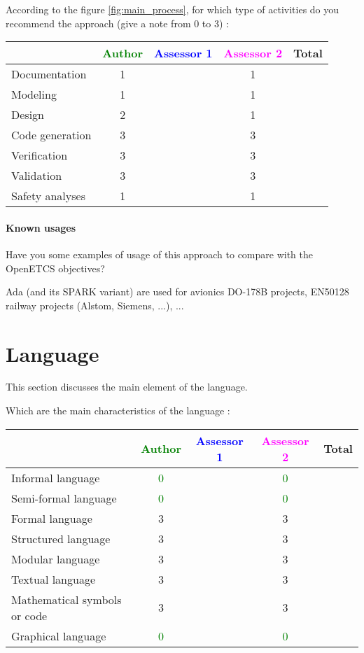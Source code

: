 According to the figure \ref{fig:main_process}, for which type of activities do you recommend the approach (give a note from 0 to  3) :

\begin{tabular}{|l | c | c | c | c|}
\hline
& \textcolor{green}{Author} & \textcolor{blue}{Assessor 1} & \textcolor{magenta}{Assessor 2} & Total \\
\hline 
Documentation & 1    & & 1    &  \\
\hline
Modeling & 1    & & 1    &  \\
\hline
Design & 2    & & 1    & \\
\hline
Code generation & 3    & & 3    & \\
\hline
Verification & 3    & & 3    & \\
\hline
Validation & 3    & & 3    & \\
\hline
Safety analyses & 1    & & 1    & \\
\hline
\end{tabular}

\paragraph{Known usages} Have you some examples of usage of this approach to  compare with the OpenETCS objectives?

Ada (and its SPARK variant) are used for avionics DO-178B
projects, EN50128 railway projects (Alstom, Siemens, ...), ...

\section{Language}
This section discusses the main element of the language.

Which are the main characteristics of the language :

\begin{tabular}{|l | c | c | c | c|}
\hline
& \textcolor{green}{Author} & \textcolor{blue}{Assessor 1} & \textcolor{magenta}{Assessor 2} & Total \\
\hline 
Informal language & \textcolor{green}{0} & & \textcolor{green}{0} &  \\
\hline 
Semi-formal language & \textcolor{green}{0} & & \textcolor{green}{0} &  \\
\hline
Formal language & 3    & & 3    &  \\
\hline
Structured language & 3    & & 3    & \\
\hline
Modular language & 3    & & 3    & \\
\hline
Textual language & 3    & & 3    & \\
\hline
Mathematical symbols or code & 3    & & 3    & \\
\hline
Graphical language & \textcolor{green}{0} & & \textcolor{green}{0} & \\
\hline
\end{tabular}

